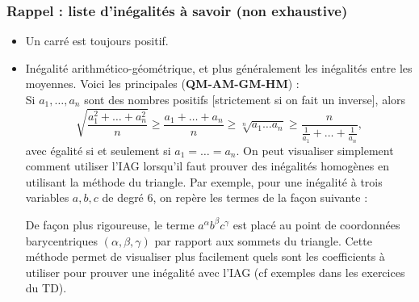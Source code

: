 \documentclass[12pt,A4]{book}
\theoremstyle{definition}
\begin{document}
\subsubsection{Rappel : liste d'inégalités à savoir (non exhaustive)}

\begin{itemize}
\item Un carré est toujours positif.
\item Inégalité arithmético-géométrique, et plus généralement les inégalités entre les moyennes. Voici les principales (\textbf{QM-AM-GM-HM}) :\\
Si $a_1,\dots,a_n$ sont des nombres positifs [strictement si on fait un inverse], alors
\[\sqrt{\frac{a_1^2+\dots+a_n^2}{n}}\geq\frac{a_1+\dots+a_n}{n}\geq\sqrt[n]{a_1\dots a_n}\geq\frac{n}{\frac{1}{a_1}+\dots+\frac{1}{a_n}},\]
avec égalité si et seulement si $a_1=\dots=a_n$.
On peut visualiser simplement comment utiliser l'IAG lorsqu'il faut prouver des inégalités homogènes en utilisant la méthode du triangle. Par exemple, pour une inégalité à trois variables $a,b,c$ de degré 6, on repère les termes de la façon suivante :
\begin{center}
\end{center}
De façon plus rigoureuse, le terme $a^\alpha b^\beta c^\gamma$ est plac\'e au point de coordonn\' ees barycentriques $(\alpha, \beta, \gamma)$ par rapport aux sommets du triangle. Cette méthode permet de visualiser plus facilement quels sont les coefficients à utiliser pour prouver une inégalité avec l'IAG (cf exemples dans les exercices du TD).


\end{itemize}
\end{document}
